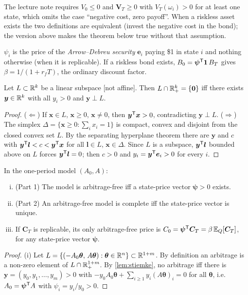 \begin{paracol}{2}
\begin{coursenote}
The lecture note requires $V_0\le0$ and $\bm V_T\ge0$ with $V_T(\omega_i)>0$ for at least one state,
which omits the case ``negative cost, zero payoff''. When a riskless asset exists the two definitions
are equivalent (invest the negative cost in the bond); the version above makes the theorem below
true without that assumption.
\end{coursenote}

$\psi_i$ is the price of the \emph{Arrow--Debreu security} $\bm e_i$ paying \$1 in state $i$ and nothing
otherwise (when it is replicable). If a riskless bond exists, $B_0=\bm\psi^{\mathsf T}\bm 1\,B_T$ gives
$\beta=1/(1+r_fT)$, the ordinary discount factor.

\begin{lemma}[Stiemke]\label{lem:stiemke}
Let $L\subset\mathbb{R}^k$ be a linear subspace [not affine]. Then $L\cap\mathbb{R}^k_{+}=\{\bm 0\}$ iff there exists $\bm y\in\mathbb{R}^k$ with
all $y_i>0$ and $\bm y\perp L$.
\end{lemma}
\begin{proof}
($\Leftarrow$) If $\bm x\in L$, $\bm x\ge0$, $\bm x\ne0$, then $\bm y^{\mathsf T}\bm x>0$, contradicting $\bm y\perp L$.
($\Rightarrow$) The simplex $\Delta=\{\bm x\ge0:\sum_ix_i=1\}$ is compact, convex and disjoint from the closed
convex set $L$. By the separating hyperplane theorem there are $\bm y$ and $c$ with $\bm y^{\mathsf T}\bm l<c<\bm y^{\mathsf T}\bm x$
for all $\bm l\in L$, $\bm x\in\Delta$. Since $L$ is a subspace, $\bm y^{\mathsf T}\bm l$ bounded above on $L$ forces
$\bm y^{\mathsf T}\bm l=0$; then $c>0$ and $y_i=\bm y^{\mathsf T}\bm e_i>0$ for every $i$.
\end{proof}

\begin{theorem}\label{thm:ftap}
In the one-period model $(A_0,A)$:
\begin{enumerate}[(i)]
  \item (Part 1) The model is arbitrage-free iff a state-price vector $\bm\psi>0$ exists.
  \item (Part 2) An arbitrage-free model is complete iff the state-price vector is unique.
  \item If $\bm C_T$ is replicable, its only arbitrage-free price is
        $C_0=\bm\psi^{\mathsf T}\bm C_T=\beta\,\mathbb{E}_Q[\bm C_T]$, for any state-price vector $\bm\psi$.
\end{enumerate}
\end{theorem}
\begin{proof}
(i) Let $L=\{(-A_0\bm\theta,\,A\bm\theta):\bm\theta\in\mathbb{R}^n\}\subset\mathbb{R}^{1+m}$. By definition an arbitrage is a
non-zero element of $L\cap\mathbb{R}^{1+m}_+$. By \cref{lem:stiemke}, no arbitrage iff there is
$\bm y=(y_0,y_1,\dots,y_m)>0$ with $-y_0A_0\bm\theta+\sum_{i\ge1}y_i(A\bm\theta)_i=0$ for all $\bm\theta$, i.e.\
$A_0=\bm\psi^{\mathsf T} A$ with $\psi_i=y_i/y_0>0$.


\end{proof}
\end{paracol}
